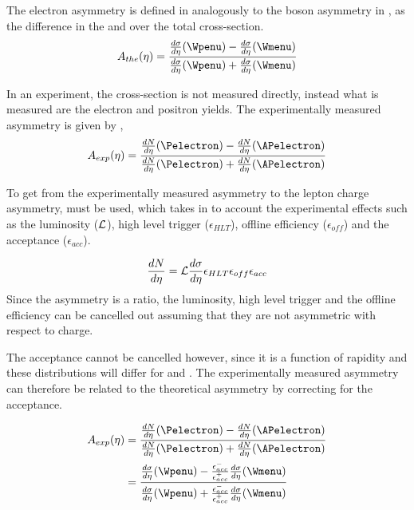 The electron asymmetry is defined in  analogously to the
\PW boson asymmetry in , as the difference in the
\HepProcess{\PWplus \to \APelectron} and \HepProcess{\PWminus \to \Pelectron}
over the total \inclusiveWe cross-section.
\begin{equation}
A_{the}(\eta)=\frac{  \frac{d\sigma}{d\eta}(\Wpenu) -
\frac{d\sigma}{d\eta}(\Wmenu) }{ \frac{d\sigma}{d\eta}(\Wpenu) +
\frac{d\sigma}{d\eta}(\Wmenu) }
\label{eq:AsymThe}
\end{equation} 

In an experiment, the cross-section is not measured directly, instead what is
measured are the electron and positron yields.  The experimentally measured
asymmetry is given by ,
\begin{equation}
A_{exp}(\eta)=\frac{  \frac{dN}{d\eta}(\Pelectron) -
\frac{dN}{d\eta}(\APelectron) }{ \frac{dN}{d\eta}(\Pelectron) +
\frac{dN}{d\eta}(\APelectron) }
\label{eq:AsymExp}
\end{equation} 

To get from the experimentally measured asymmetry to the lepton charge
asymmetry,  must be used, which takes in to
account the experimental effects such as the luminosity (${\cal L}$), high
level trigger ($\epsilon_{HLT}$), offline efficiency ($ \epsilon_{off}$) and
the acceptance ($\epsilon_{acc}$).

\begin{equation}
\frac{dN}{d\eta} = {\cal L } \frac{d\sigma}{d\eta}  \epsilon_{HLT}
\epsilon_{off} \epsilon_{acc}
\label{eq:NumEve}
\end{equation} 
Since the asymmetry is a ratio, the luminosity, high level trigger and the
offline efficiency can be cancelled out assuming that they are not asymmetric
with respect to charge. 

The acceptance cannot be cancelled however, since it is a function of rapidity and 
these distributions will differ for \Pelectron and \APelectron.
The experimentally measured asymmetry can therefore be related to the
theoretical asymmetry by correcting for the acceptance.

\begin{align} 
A_{exp}(\eta) &= \frac{ \frac{dN}{d\eta}(\Pelectron) -
\frac{dN}{d\eta}(\APelectron) }{ \frac{dN}{d\eta}(\Pelectron) +
\frac{dN}{d\eta}(\APelectron) }\\   
              &= \frac{ \frac{d\sigma}{d\eta}(\Wpenu) -
\frac{\epsilon^{-}_{acc}}{\epsilon^{+}_{acc}} \frac{d\sigma}{d\eta}(\Wmenu) }{
\frac{d\sigma}{d\eta}(\Wpenu) + \frac{\epsilon^{-}_{acc}}{\epsilon^{+}_{acc}}
\frac{d\sigma}{d\eta}(\Wmenu) }
\label{eq:AsymExpCorr}
\end{align}

